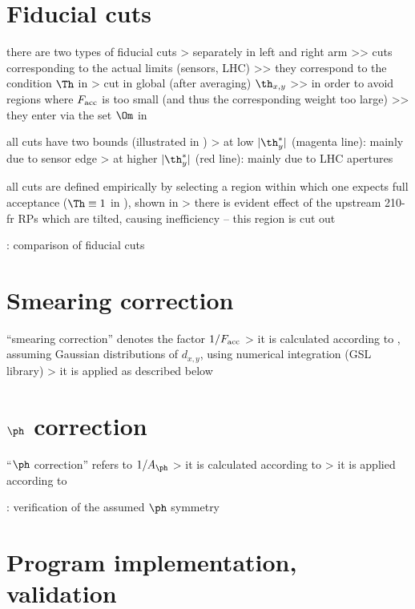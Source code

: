 \section{Fiducial cuts}

\> there are two types of fiducial cuts
\>> separately in left and right arm
\>>> cuts corresponding to the actual limits (sensors, LHC)
\>>> they correspond to the condition $\Th$ in 
\>> cut in global (after averaging) $\th_{x, y}$
\>>> in order to avoid regions where $F_{\rm acc}$ is too small (and thus the corresponding weight too large)
\>>> they enter via the set $\Om$ in 

\> all cuts have two bounds (illustrated in )
\>> at low $|\th_y^*|$ (magenta line): mainly due to sensor edge
\>> at higher $|\th_y^*|$ (red line): mainly due to LHC apertures

\> all cuts are defined empirically by selecting a region within which one expects full acceptance ($\Th \equiv 1$ in ), shown in 
\>> there is evident effect of the upstream 210-fr RPs which are tilted, causing inefficiency -- this region is cut out

\> : comparison of fiducial cuts


\section{Smearing correction}

\> ``smearing correction'' denotes the factor $1/F_{\rm acc}$
\>> it is calculated according to , assuming Gaussian distributions of $d_{x,y}$, using numerical integration (GSL library)
\>> it is applied as described below 


\section{$\ph$ correction}

\> ``$\ph$ correction'' refers to $1 / A_{\ph}$
\>> it is calculated according to 
\>> it is applied according to 


\>  : verification of the assumed $\ph$ symmetry


\section{Program implementation, validation}

